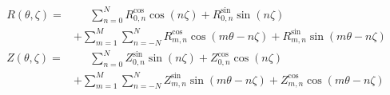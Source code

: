 \documentclass[a4paper, 12pt]{article}
\begin{document}
\begin{align*}
R(\theta, \zeta) =& \phantom{+}~                      \sum\limits_{n= 0}^{N}   R_{0,n}^\mathrm{cos} \cos \left(            n \zeta \right)
                                                                             + R_{0,n}^\mathrm{sin} \sin \left(            n \zeta \right) \\
                 ~&          +  \sum\limits_{m=1}^{M} \sum\limits_{n=-N}^{N}   R_{m,n}^\mathrm{cos} \cos \left( m \theta - n \zeta \right)
                                                                             + R_{m,n}^\mathrm{sin} \sin \left( m \theta - n \zeta \right) \\
Z(\theta, \zeta) =& \phantom{+}~                      \sum\limits_{n= 0}^{N}   Z_{0,n}^\mathrm{sin} \sin \left(            n \zeta \right)
                                                                             + Z_{0,n}^\mathrm{cos} \cos \left(            n \zeta \right) \\
                 ~&          +  \sum\limits_{m=1}^{M} \sum\limits_{n=-N}^{N}   Z_{m,n}^\mathrm{sin} \sin \left( m \theta - n \zeta \right)
                                                                             + Z_{m,n}^\mathrm{cos} \cos \left( m \theta - n \zeta \right)
\end{align*}
\end{document}
